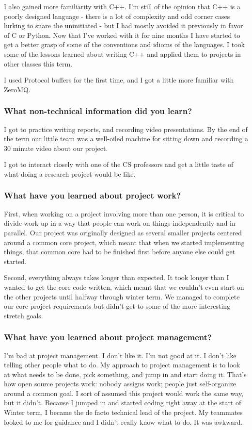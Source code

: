 I also gained more familiarity with C++. I'm still of the opinion that C++ is a poorly designed language - there is a lot of complexity and odd corner cases lurking to snare the uninitiated - but I had mostly avoided it previously in favor of C or Python. Now that I’ve worked with it for nine months I have started to get a better grasp of some of the conventions and idioms of the languages.  I took some of the lessons learned about writing C++ and applied them to projects in other classes this term.

I used Protocol buffers for the first time, and I got a little more familiar with ZeroMQ.

\subsubsection{What non-technical information did you learn?}

I got to practice writing reports, and recording video presentations.
By the end of the term our little team was a well-oiled machine for sitting down and recording a  30 minute video about our project.

I got to interact closely with one of the CS professors and get a little taste of what doing a research project would be like.


\subsubsection{What have you learned about project work?}

First, when working on a project involving more than one person, it is critical to divide work up in a way that people can work on things independently and in parallel. Our project was originally designed as several smaller projects centered around a common core project, which meant that when we started implementing things, that common core had to be finished first before anyone else could get started.

Second, everything always takes longer than expected. It took longer than I wanted to get the core code written, which meant that we couldn’t even start on the other projects until halfway through winter term. We managed to complete our core project requirements but didn’t get to some of the more interesting stretch goals.


\subsubsection{What have you learned about project management?}
I'm bad at project management.
I don’t like it. I’m not good at it.
I don’t like telling other people what to do.
My approach to project management is to look at what needs to be done, pick something, and jump in and start doing it.
That's how open source projects work: nobody assigns work; people just self-organize around a common goal.
I sort of assumed this project would work the same way, but it didn't.
Because I jumped in and started coding right away at the start of Winter term,
I became the de facto technical lead of the project.
My teammates looked to me for guidance and I didn't really know what to do. It was awkward.

